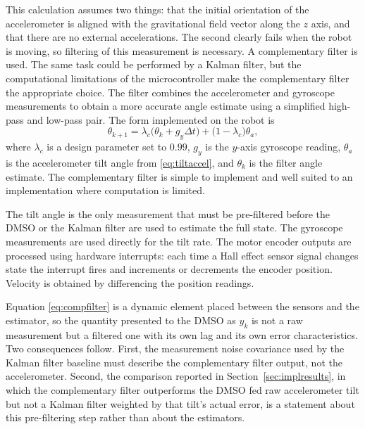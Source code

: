 This calculation assumes two things: that the initial orientation of the
accelerometer is aligned with the gravitational field vector along the $z$ axis,
and that there are no external accelerations. The second clearly fails when the
robot is moving, so filtering of this measurement is necessary. A complementary
filter \cite{higgins1975comparison} is used. The same task could be performed
by a Kalman filter, but the computational limitations of the microcontroller
make the complementary filter the appropriate choice. The filter combines the
accelerometer and gyroscope measurements to obtain a more accurate angle
estimate using a simplified high-pass and low-pass pair. The form implemented on
the robot is
\begin{equation}\label{eq:compfilter}
\theta_{k+1}=\lambda_c\bigl(\theta_k+g_y\Delta t\bigr)+\bigl(1-\lambda_c\bigr)\theta_a ,
\end{equation}
where $\lambda_c$ is a design parameter set to $0.99$, $g_y$ is the $y$-axis
gyroscope reading, $\theta_a$ is the accelerometer tilt angle from
\eqref{eq:tiltaccel}, and $\theta_k$ is the filter angle estimate. The
complementary filter is simple to implement and well suited to an
implementation where computation is limited.

The tilt angle is the only measurement that must be pre-filtered before the
DMSO or the Kalman filter are used to estimate the full state. The gyroscope
measurements are used directly for the tilt rate. The motor encoder outputs are
processed using hardware interrupts: each time a Hall effect sensor signal
changes state the interrupt fires and increments or decrements the encoder
position. Velocity is obtained by differencing the position readings.

\begin{remark}
Equation \eqref{eq:compfilter} is a dynamic element placed between the sensors
and the estimator, so the quantity presented to the DMSO as $y_k$ is not a raw
measurement but a filtered one with its own lag and its own error
characteristics. Two consequences follow. First, the measurement noise
covariance used by the Kalman filter baseline must describe the complementary
filter output, not the accelerometer. Second, the comparison reported in
Section~\ref{sec:implresults}, in which the complementary filter outperforms
the DMSO fed raw accelerometer tilt but not a Kalman filter weighted by that
tilt's actual error, is a statement about this pre-filtering step rather than
about the estimators.
\end{remark}

